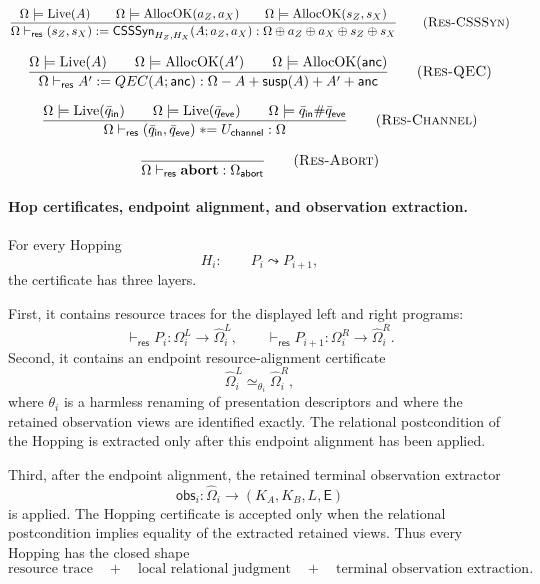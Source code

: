 \documentclass{report}
\theoremstyle{defn_style}
\newcommand{\asteq}{\mathrel{*}=}
\providecommand{\Live}{\operatorname{Live}}
\providecommand{\AllocOK}{\operatorname{AllocOK}}
\providecommand{\susp}{\mathsf{susp}}
\begin{document}
\[
\frac{
  \Omega\models\Live(A)
  \qquad
  \Omega\models\AllocOK(a_Z,a_X)
  \qquad
  \Omega\models\AllocOK(s_Z,s_X)
}{
  \Omega\vdash_{\mathsf{res}}
  (s_Z,s_X):=\mathsf{CSSSyn}_{H_Z,H_X}(A;a_Z,a_X)
  :
  \Omega\oplus a_Z\oplus a_X\oplus s_Z\oplus s_X
}
\tag{\textsc{Res-CSSSyn}}
\]

\[
\frac{
  \Omega\models\Live(A)
  \qquad
  \Omega\models\AllocOK(A')
  \qquad
  \Omega\models\AllocOK(\mathsf{anc})
}{
  \Omega\vdash_{\mathsf{res}}
  A':=QEC(A;\mathsf{anc})
  :
  \Omega-A+\susp(A)+A'+\mathsf{anc}
}
\tag{\textsc{Res-QEC}}
\]

\[
\frac{
  \Omega\models\Live(\bar q_{\mathsf{in}})
  \qquad
  \Omega\models\Live(\bar q_{\mathsf{eve}})
  \qquad
  \Omega\models \bar q_{\mathsf{in}}\#\bar q_{\mathsf{eve}}
}{
  \Omega\vdash_{\mathsf{res}}
  (\bar q_{\mathsf{in}},\bar q_{\mathsf{eve}})
  \asteq U_{\mathsf{channel}}
  :
  \Omega
}
\tag{\textsc{Res-Channel}}
\]

\[
\frac{}{\Omega\vdash_{\mathsf{res}}\mathbf{abort}:\Omega_{\mathsf{abort}}}
\tag{\textsc{Res-Abort}}
\]

\paragraph{Hop certificates, endpoint alignment, and observation extraction.}
For every Hopping
\[
  H_i:\qquad P_i\leadsto P_{i+1},
\]
the certificate has three layers.

First, it contains resource traces for the displayed left and right programs:
\[
  \vdash_{\mathsf{res}}P_i:
  \Omega_i^L\longrightarrow\widehat\Omega_i^L,
  \qquad
  \vdash_{\mathsf{res}}P_{i+1}:
  \Omega_i^R\longrightarrow\widehat\Omega_i^R.
\]
Second, it contains an endpoint resource-alignment certificate
\[
  \widehat\Omega_i^L\simeq_{\theta_i}\widehat\Omega_i^R,
\tag{Endpoint-Align}
\]
where \(\theta_i\) is a harmless renaming of presentation descriptors and where
the retained observation views are identified exactly.  The relational
postcondition of the Hopping is extracted only after this endpoint alignment has
been applied.

Third, after the endpoint alignment, the retained terminal observation extractor
\[
  \mathsf{obs}_i:\widehat\Omega_i\to(K_A,K_B,L,\mathsf E)
\tag{Obs-Extractor}
\]
is applied.  The Hopping certificate is accepted only when the relational
postcondition implies equality of the extracted retained views.  Thus every
Hopping has the closed shape
\[
  \text{resource trace}
  \quad+\quad
  \text{local relational judgment}
  \quad+\quad
  \text{terminal observation extraction}.
\]
\end{document}
